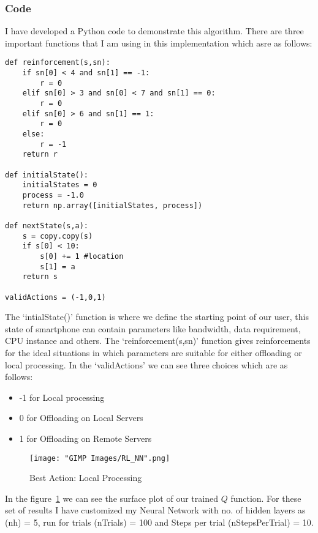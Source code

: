 \documentclass[12pt]{report}
\begin{document}
\subsubsection{Code}
I have developed a Python code to demonstrate this algorithm. There are three important functions that I am using in this implementation which asre as follows:
\begin{small}
\begin{lstlisting}
def reinforcement(s,sn):
    if sn[0] < 4 and sn[1] == -1:
        r = 0
    elif sn[0] > 3 and sn[0] < 7 and sn[1] == 0:
        r = 0
    elif sn[0] > 6 and sn[1] == 1:
        r = 0
    else:
        r = -1  
    return r       

def initialState():
    initialStates = 0
    process = -1.0
    return np.array([initialStates, process])

def nextState(s,a):
    s = copy.copy(s)
    if s[0] < 10:
        s[0] += 1 #location
        s[1] = a
    return s

validActions = (-1,0,1)
\end{lstlisting}
\end{small}

The `intialState()' function is where we define the starting point of our user, this state of smartphone can contain parameters like bandwidth, data requirement, CPU instance and others. The `reinforcement(s,sn)' function gives reinforcements for the ideal situations in which parameters are suitable for either offloading or local processing.
In the `validActions' we can see three choices which are as follows:
\begin{itemize}
   \item -1 for Local processing
   \item 0 for Offloading on Local Servers
   \item 1 for Offloading on Remote Servers
\end{itemize}      


\begin{figure}[h!]
  \centering
  \texttt{[image: "GIMP Images/RL\_NN".png]}
  \caption{Best Action: Local Processing}
  \label{fig:RL_NN}
\end{figure}
In the figure~\ref{fig:RL_NN} we can see the surface plot of our trained $Q$ function. For these set of results I have customized my Neural Network with no. of hidden layers as (nh) = 5, run for trials (nTrials) = 100 and Steps per trial (nStepsPerTrial) = 10. \par
\end{document}
